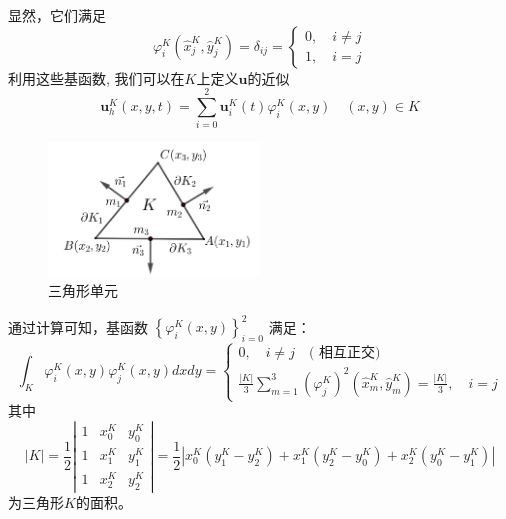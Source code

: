 \documentclass[a4paper, 12pt, UTF8]{ctexart}
\newcommand{\bs}[1]{\boldsymbol{#1}}
\begin{document}
显然，它们满足
\begin{equation}
\varphi_{i}^K(\hat{x}_{j}^K, \hat{y}_{j}^K)=\delta_{ij}=\begin{cases}
\displaystyle 0,\quad i\neq j\\
\displaystyle 1, \quad i=j
\end{cases}
\end{equation}
利用这些基函数, 我们可以在$K$上定义$\bs u$的近似
\begin{equation}\label{numericsolution}
\bs u_{h}^K(x, y, t)=\sum\limits_{i=0}^{2} \bs u_{i}^K(t) \varphi_{i}^K(x, y) \quad(x, y) \in K
\end{equation}
\begin{figure}[!ht]
\centering
\includegraphics[width=0.5\textwidth]{images/1.png}
\caption{三角形单元}
\label{triangle}
\end{figure}

\newpage

通过计算可知，基函数 $\left\{\varphi_{i}^K(x, y)\right\}_{i=0}^2$ 满足：
\begin{equation}\label{othorgnal}
\int_{K} \varphi_{i}^K(x, y) \varphi_{j}^K(x, y) d x d y=
\begin{cases}
\displaystyle 	0, \quad i \neq j \quad(\text { 相互正交) } \\
\displaystyle 	\frac{|K|}{3} \sum\limits_{m=1}^{3} (\varphi_{j}^K)^{2}\left(\hat{x}_{m}^K, \hat{y}_{m}^K\right)=\frac{|K|}{3}, \quad i=j   
    \end{cases}
\end{equation}
其中 
$$|K|=\frac{1}{2}\left|\begin{array}{lll}
1 & x_{0}^K & y_{0}^K\\
1 & x_{1}^K & y_{1}^K \\
1 & x_{2}^K & y_{2}^K 
\end{array}\right| = \frac{1}{2}\left| x_{0}^K\left(y_{1}^K-y_{2}^K\right)+x_{1}^K\left(y_{2}^K-y_{0}^K\right)+x_{2}^K\left(y_{0}^K-y^K_{1}\right)\right|$$ 为三角形$K$的面积。
\end{document}
